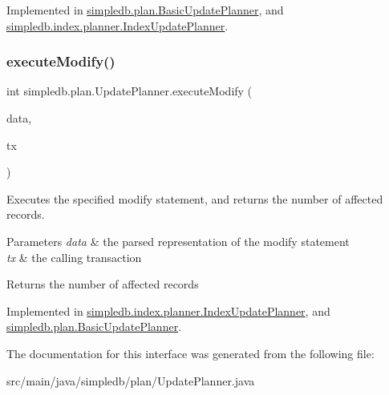 Implemented in \hyperlink{classsimpledb_1_1plan_1_1BasicUpdatePlanner_a8c1ed83755ef7d71adab3590b3d995fa}{simpledb.\+plan.\+Basic\+Update\+Planner}, and \hyperlink{classsimpledb_1_1index_1_1planner_1_1IndexUpdatePlanner_ab6e0638b0692e80ec5685ce0b75214a9}{simpledb.\+index.\+planner.\+Index\+Update\+Planner}.

\mbox{\label{interfacesimpledb_1_1plan_1_1UpdatePlanner_af887ff3fe178adb4fc3b3bee98acde73}} 
\subsubsection{\texorpdfstring{execute\+Modify()}{executeModify()}}
{\footnotesize\ttfamily int simpledb.\+plan.\+Update\+Planner.\+execute\+Modify (\begin{DoxyParamCaption}\item[{\hyperlink{classsimpledb_1_1parse_1_1ModifyData}{Modify\+Data}}]{data,  }\item[{\hyperlink{classsimpledb_1_1tx_1_1Transaction}{Transaction}}]{tx }\end{DoxyParamCaption})}

Executes the specified modify statement, and returns the number of affected records. 
\begin{DoxyParams}{Parameters}
{\em data} & the parsed representation of the modify statement \\
\hline
{\em tx} & the calling transaction \\
\hline
\end{DoxyParams}
\begin{DoxyReturn}{Returns}
the number of affected records 
\end{DoxyReturn}


Implemented in \hyperlink{classsimpledb_1_1index_1_1planner_1_1IndexUpdatePlanner_a540a81b73146d9d7b1404d62cfcf13ff}{simpledb.\+index.\+planner.\+Index\+Update\+Planner}, and \hyperlink{classsimpledb_1_1plan_1_1BasicUpdatePlanner_a938959eb04b3f6079876760e67b4627f}{simpledb.\+plan.\+Basic\+Update\+Planner}.



The documentation for this interface was generated from the following file\+:\begin{DoxyCompactItemize}
\item 
src/main/java/simpledb/plan/Update\+Planner.\+java\end{DoxyCompactItemize}
